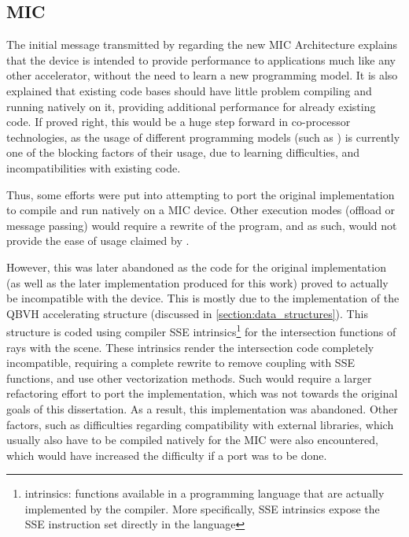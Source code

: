 \documentclass[main.tex]{subfiles}
\begin{document}
\subsection{MIC} \label{section:impl_mic}

The initial message transmitted by \intel regarding the new \acs{MIC} Architecture explains that the device is intended to provide performance to applications much like any other accelerator, without the need to learn a new programming model. It is also explained that existing code bases should have little problem compiling and running natively on it, providing additional performance for already existing \cpu code.
If proved right, this would be a huge step forward in co-processor technologies, as the usage of different programming models (such as \cuda) is currently one of the blocking factors of their usage, due to learning difficulties, and incompatibilities with existing code.

Thus, some efforts were put into attempting to port the original implementation to compile and run natively on a \ac{MIC} device. Other execution modes (offload or message passing) would require a rewrite of the program, and as such, would not provide the ease of usage claimed by \intel.

However, this was later abandoned as the code for the original implementation (as well as the later \cpu implementation produced for this work) proved to actually be incompatible with the device. This is mostly due to the implementation of the \acs{QBVH} accelerating structure (discussed in \cref{section:data_structures}). This structure is coded using compiler \acs{SSE} intrinsics\footnote{intrinsics: functions available in a programming language that are actually implemented by the compiler. More specifically, \acs{SSE} intrinsics expose the \acs{SSE} instruction set directly in the language} for the intersection functions of rays with the scene.
These intrinsics render the intersection code completely incompatible, requiring a complete rewrite to remove coupling with \acs{SSE} functions, and use other vectorization methods. Such would require a larger refactoring effort to port the implementation, which was not towards the original goals of this dissertation. As a result, this implementation was abandoned.
Other factors, such as difficulties regarding compatibility with external libraries, which usually also have to be compiled natively for the \acs{MIC} were also encountered, which would have increased the difficulty if a port was to be done.
\end{document}
